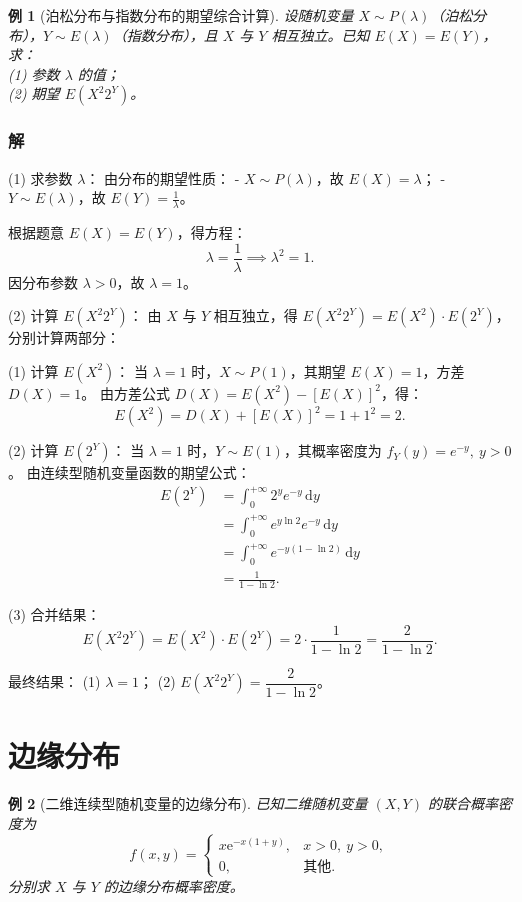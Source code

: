 \documentclass[11pt,a4paper,oneside,openany]{book}
\theoremstyle{yhbthm}
\newtheorem{example}{例}[section]
\begin{document}
\begin{example}[泊松分布与指数分布的期望综合计算]
设随机变量 $X \sim P(\lambda)$（泊松分布），$Y \sim E(\lambda)$（指数分布），且 $X$ 与 $Y$ 相互独立。已知 $E(X) = E(Y)$，求：\\
(1) 参数 $\lambda$ 的值；\\
(2) 期望 $E(X^2 2^Y)$。
\end{example}

\subsubsection{解}
(1) 求参数 $\lambda$：
由分布的期望性质：
- $X \sim P(\lambda)$，故 $E(X) = \lambda$；
- $Y \sim E(\lambda)$，故 $E(Y) = \frac{1}{\lambda}$。

根据题意 $E(X) = E(Y)$，得方程：
\[
\lambda = \frac{1}{\lambda} \implies \lambda^2 = 1.
\]
因分布参数 $\lambda > 0$，故 $\lambda = 1$。

(2) 计算 $E(X^2 2^Y)$：
由 $X$ 与 $Y$ 相互独立，得 $E(X^2 2^Y) = E(X^2) \cdot E(2^Y)$，分别计算两部分：

(1) 计算 $E(X^2)$：
当 $\lambda = 1$ 时，$X \sim P(1)$，其期望 $E(X) = 1$，方差 $D(X) = 1$。
由方差公式 $D(X) = E(X^2) - [E(X)]^2$，得：
\[
E(X^2) = D(X) + [E(X)]^2 = 1 + 1^2 = 2.
\]

(2) 计算 $E(2^Y)$：
当 $\lambda = 1$ 时，$Y \sim E(1)$，其概率密度为 $f_Y(y) = e^{-y},\ y > 0$。
由连续型随机变量函数的期望公式：
\[
\begin{aligned}
E(2^Y) &= \int_{0}^{+\infty} 2^y e^{-y} \,\mathrm{d}y \\
&= \int_{0}^{+\infty} e^{y \ln 2} e^{-y} \,\mathrm{d}y \\
&= \int_{0}^{+\infty} e^{-y(1 - \ln 2)} \,\mathrm{d}y \\
&= \frac{1}{1 - \ln 2}.
\end{aligned}
\]

(3) 合并结果：
\[
E(X^2 2^Y) = E(X^2) \cdot E(2^Y) = 2 \cdot \frac{1}{1 - \ln 2} = \frac{2}{1 - \ln 2}.
\]

最终结果：
(1) $\boxed{\lambda = 1}$；
(2) $\boxed{E(X^2 2^Y) = \dfrac{2}{1 - \ln 2}}$。

\section{边缘分布}

\begin{example}[二维连续型随机变量的边缘分布]
已知二维随机变量 $(X,Y)$ 的联合概率密度为
\[
f(x,y) = 
\begin{cases}
x \mathrm{e}^{-x(1+y)}, & x>0,\ y>0, \\
0, & \text{其他}.
\end{cases}
\]
分别求 $X$ 与 $Y$ 的边缘分布概率密度。
\end{example}
\end{document}

